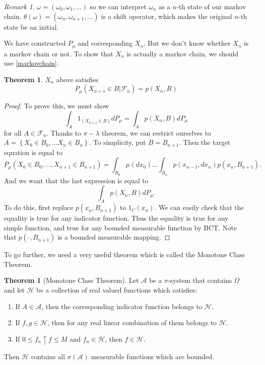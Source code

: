 \documentclass{memoir}
\theoremstyle{definition}
\newtheorem{theorem}[definition]{Theorem}
\theoremstyle{remark}
\newtheorem*{remark}{Remark}
\begin{document}
\begin{remark}
	$\omega = (\omega_0, \omega_1, \dots)$ so we can interpret $\omega_n$ as a $n$-th state of our markov chain.
	$\theta(\omega) = (\omega_n, \omega_{n+1}, \dots)$ is a shift operator, which makes the original $n$-th state be an initial.
	\label{<+label+>}
\end{remark}

We have constructed $P_\mu$ and corresponding $X_n$.
But we don't know whether $X_n$ is a markov chain or not.
To show that $X_n$ is actually a markov chain, we should use \ref{markovchain}.

\begin{theorem}
	$X_n$ above satisfies
\[
	P_\mu\left( X_{n+1} \in B \lvert \mathcal{F}_n \right) = p\left( X_n, B \right)
\]
	\label{<+label+>}
\end{theorem}
\begin{proof}
	To prove this, we must show
	\[
		\int_A 1_{\left( X_{n+1} \in B \right)}dP_\mu = \int_A p\left( X_n, B \right) dP_\mu
	\]
	for all $A \in \mathcal{F}_n$.
	Thanks to $\pi-\lambda$ theorem, we can restrict ourselves to $A = \left\{ X_0 \in B_0, \dots X_n \in B_n \right\}$.
	To simplicity, put $B = B_{n+1}$.
	Then the target equation is equal to
	\[
		P_\mu\left( X_0 \in B_0, \dots, X_{n+1} \in B_{n+1} \right) = \int_{B_0}\mu(dx_0)\dots\int_{B_n}p(x_{n-1}, dx_n)p(x_n, B_{n+1}).
	\]
	And we want that the last expression is equal to
	\[
		\int_A p(X_n, B)dP_\mu.
	\]
	To do this, first replace $p(x_n, B_{n+1})$ to $1_C(x_n)$.
	We can easily check that the equality is true for any indicator function.
	Thus the equality is true for any simple function, and true for any bounded measurable function by BCT.
	Note that $p(\cdot, B_{n+1})$ is a bounded measurable mapping.

\end{proof}

To go further, we need a very useful theorem which is called the Monotone Class Theorem.

\begin{theorem}[Monotone Class Theorem]
	Let $\mathcal{A}$ be a $\pi$-system that contains $\Omega$ and let $\mathcal{H}$ be a collection of real valued functions which satisfies:
	\begin{enumerate}
		\item If $A \in \mathcal{A}$, then the corresponding indicator function belongs to $\mathcal{H}$.
		\item If $f, g\in \mathcal{H}$, then for any real linear combination of them belongs to $\mathcal{H}$.
		\item If $0\leq f_n \uparrow f \leq M$ and $f_n \in \mathcal{H}$, then $f \in \mathcal{H}$.
	\end{enumerate}
	Then $\mathcal{H}$ contains all $\sigma(\mathcal{A})$ measurable functions which are bounded.
	\label{monotoneclassthm}
\end{theorem}
\end{document}

